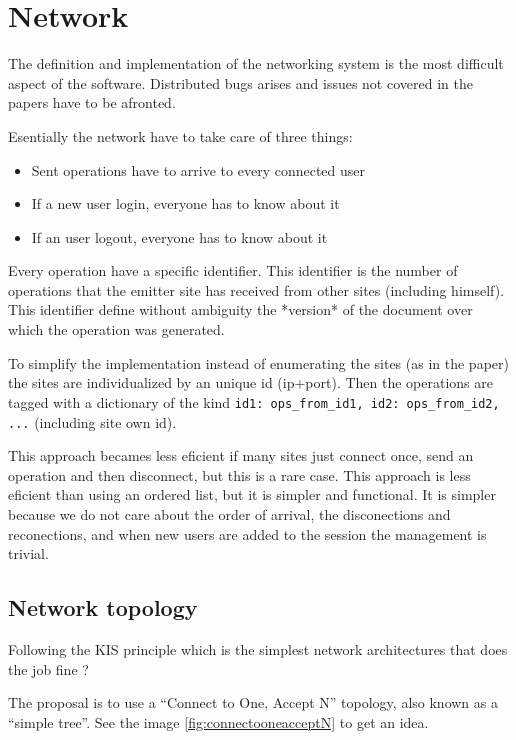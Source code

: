 \documentclass{article}
\begin{document}
\section{Network}

The definition and implementation of the networking system is the most difficult aspect of the software. Distributed bugs arises and issues not covered in the papers have to be afronted.

Esentially the network have to take care of three things:
\begin{itemize}
\item Sent operations have to arrive to every connected user
\item If a new user login, everyone has to know about it
\item If an user logout, everyone has to know about it
\end{itemize}

Every operation have a specific identifier. This identifier is the number of operations that the emitter site has received from other sites (including himself). This identifier define without ambiguity the *version* of the document over which the operation was generated.

To simplify the implementation instead of enumerating the sites (as in the paper) the sites are individualized by an unique id (ip+port). Then the operations are tagged with a dictionary of the kind {\texttt {id1: ops\_from\_id1, id2: ops\_from\_id2, ...}} (including site own id).

This approach becames less eficient if many sites just connect once, send an operation and then disconnect, but this is a rare case. This approach is less eficient than using an ordered list, but it is simpler and functional. It is simpler because we do not care about the order of arrival, the disconections and reconections, and when new users are added to the session the management is trivial.

\subsection{Network topology}

Following the KIS principle which is the simplest network architectures that does the job fine ?

The proposal is to use a ``Connect to One, Accept N'' topology, also known as a ``simple tree''. See the image \ref{fig:connectooneacceptN} to get an idea.    
\end{document}
